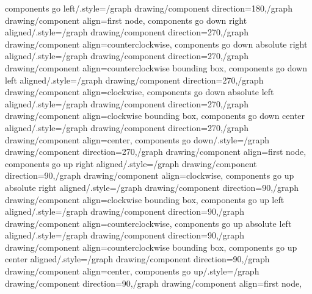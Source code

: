 {  components go left/.style={/graph drawing/component direction=180,/graph drawing/component align=first node},
  components go down right aligned/.style={/graph drawing/component direction=270,/graph drawing/component align=counterclockwise},
  components go down absolute right aligned/.style={/graph drawing/component direction=270,/graph drawing/component align=counterclockwise bounding box},
  components go down left aligned/.style={/graph drawing/component direction=270,/graph drawing/component align=clockwise},
  components go down absolute left aligned/.style={/graph drawing/component direction=270,/graph drawing/component align=clockwise bounding box},
  components go down center aligned/.style={/graph drawing/component direction=270,/graph drawing/component align=center},
  components go down/.style={/graph drawing/component direction=270,/graph drawing/component align=first node},
  components go up right aligned/.style={/graph drawing/component direction=90,/graph drawing/component align=clockwise},
  components go up absolute right aligned/.style={/graph drawing/component direction=90,/graph drawing/component align=clockwise bounding box},
  components go up left aligned/.style={/graph drawing/component direction=90,/graph drawing/component align=counterclockwise},
  components go up absolute left aligned/.style={/graph drawing/component direction=90,/graph drawing/component align=counterclockwise bounding box},
  components go up center aligned/.style={/graph drawing/component direction=90,/graph drawing/component align=center},
  components go up/.style={/graph drawing/component direction=90,/graph drawing/component align=first node},
}



% 
% 
% 
% 
% 
%


%




% 
% 

